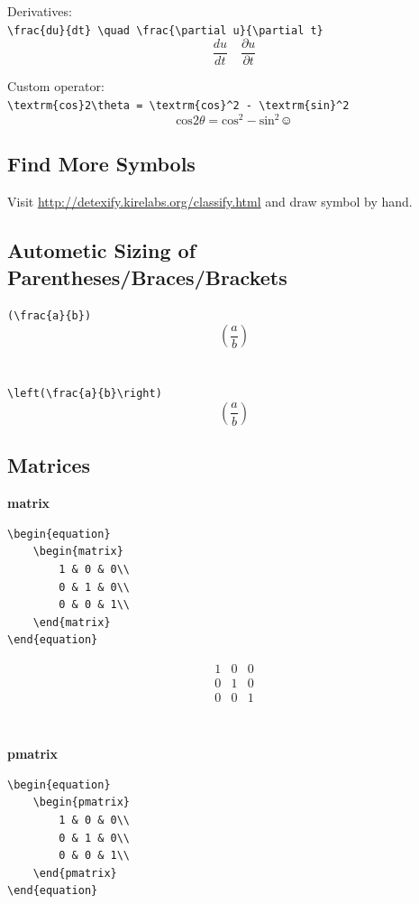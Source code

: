 \documentclass{article}
\begin{document}
Derivatives:\\
\verb|\frac{du}{dt} \quad \frac{\partial u}{\partial t}|\\
$$\frac{du}{dt} \quad \frac{\partial u}{\partial t}$$

Custom operator:\\
\verb|\textrm{cos}2\theta = \textrm{cos}^2 - \textrm{sin}^2|\\
$$\textrm{cos}2\theta = \textrm{cos}^2 - \textrm{sin}^2
\smiley$$

\subsection{Find More Symbols}

Visit \url{http://detexify.kirelabs.org/classify.html} and draw symbol by hand.


\subsection{Autometic Sizing of Parentheses/Braces/Brackets}

\verb|(\frac{a}{b})|\\
$$ (\frac{a}{b}) $$
\\~\\
\verb|\left(\frac{a}{b}\right)|
$$ \left(\frac{a}{b}\right) $$


\subsection{Matrices}

\textbf{matrix}
\begin{verbatim}
\begin{equation}
	\begin{matrix}
		1 & 0 & 0\\
		0 & 1 & 0\\
		0 & 0 & 1\\
	\end{matrix}
\end{equation}
\end{verbatim}

\begin{equation}
	\begin{matrix}
		1 & 0 & 0\\
		0 & 1 & 0\\
		0 & 0 & 1\\
	\end{matrix}
\end{equation}
\\~\\
\textbf{pmatrix}
\begin{verbatim}
\begin{equation}
	\begin{pmatrix}
		1 & 0 & 0\\
		0 & 1 & 0\\
		0 & 0 & 1\\
	\end{pmatrix}
\end{equation}
\end{verbatim}
\end{document}
